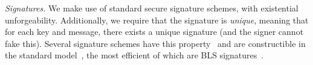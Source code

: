 \noindent
\emph{Signatures.} We make use of standard secure signature schemes, with existential unforgeability.
Additionally, we require that the signature is \emph{unique}, meaning that
for each key and message, there exists a unique signature (and the signer cannot fake this).
Several signature schemes have this property~\cite{hash-and-sign,cramer2000signature}
and are constructible in the standard model~\cite{vrf,lysyanskaya-unique},
the most efficient of which are BLS signatures~\cite{bls}.
